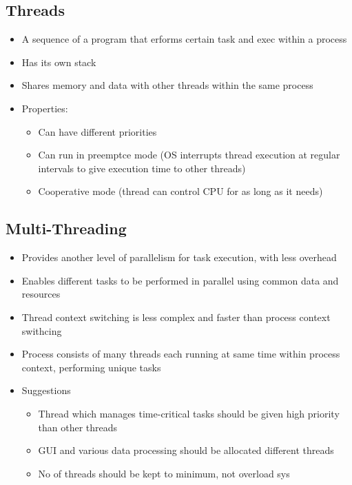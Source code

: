 \subsection{Threads}

\begin{itemize}
	\item A sequence of a program that erforms certain task and exec within
		a process
	\item Has its own stack
	\item Shares memory and data with other threads within the same process
	\item Properties:
	\begin{itemize}
		\item Can have different priorities
		\item Can run in preemptce mode (OS interrupts thread execution
			at regular intervals to give execution time to other
			threads)
		\item Cooperative mode (thread can control CPU for as long as it
			needs)
	\end{itemize}
\end{itemize}

\subsection{Multi-Threading}

\begin{itemize}
	\item Provides another level of parallelism for task execution, with
		less overhead
	\item Enables different tasks to be performed in parallel using common
		data and resources
	\item Thread context switching is less complex and faster than process
		context swithcing
	\item Process consists of many threads each running at same time within
		process context, performing unique tasks
	\item Suggestions
	\begin{itemize}
		\item Thread which manages time-critical tasks should be given
			high priority than other threads
		\item GUI and various data processing should be allocated
			different threads
		\item No of threads should be kept to minimum, not overload sys
	\end{itemize}
\end{itemize}

